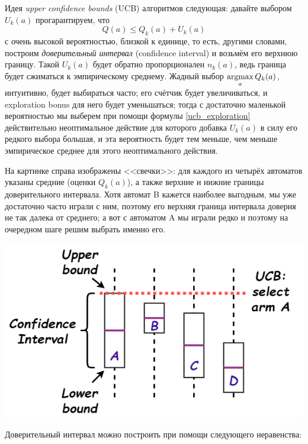 Идея \emph{upper confidence bounds} (UCB) алгоритмов следующая: давайте выбором $U_k(a)$ прогарантируем, что
$$Q(a) \le Q_k(a) + U_k(a)$$
с очень высокой вероятностью, близкой к единице, то есть, другими словами, построим \emph{доверительный интервал} (confidence interval) и возьмём его верхнюю границу. Такой $U_k(a)$ будет обратно пропорционален $n_k(a)$, ведь граница будет сжиматься к эмпирическому среднему. Жадный выбор $\mathop{\mathrm{argmax}}\limits_a Q_k(a)$, интуитивно, будет выбираться часто; его счётчик будет увеличиваться, и exploration bonus для него будет уменьшаться; тогда с достаточно маленькой вероятностью мы выберем при помощи формулы \eqref{ucb_exploration} действительно неоптимальное действие для которого добавка $U_k(a)$ в силу его редкого выбора большая, и эта вероятность будет тем меньше, чем меньше эмпирическое среднее для этого неоптимального действия.

\begin{exampleBox}[righthand ratio=0.4, sidebyside, sidebyside align=center, lower separated=false]{}
На картинке справа изображены <<свечки>>: для каждого из четырёх автоматов указаны средние (оценки $Q_k(a)$), а также верхние и нижние границы доверительного интервала. Хотя автомат B кажется наиболее выгодным, мы уже достаточно часто играли с ним, поэтому его верхняя граница интервала доверия не так далека от среднего; а вот с автоматом A мы играли редко и поэтому на очередном шаге решим выбрать именно его.

\tcblower
\includegraphics[width=\textwidth]{Images/UCB.png}
\end{exampleBox}

Доверительный интервал можно построить при помощи следующего неравенства:

